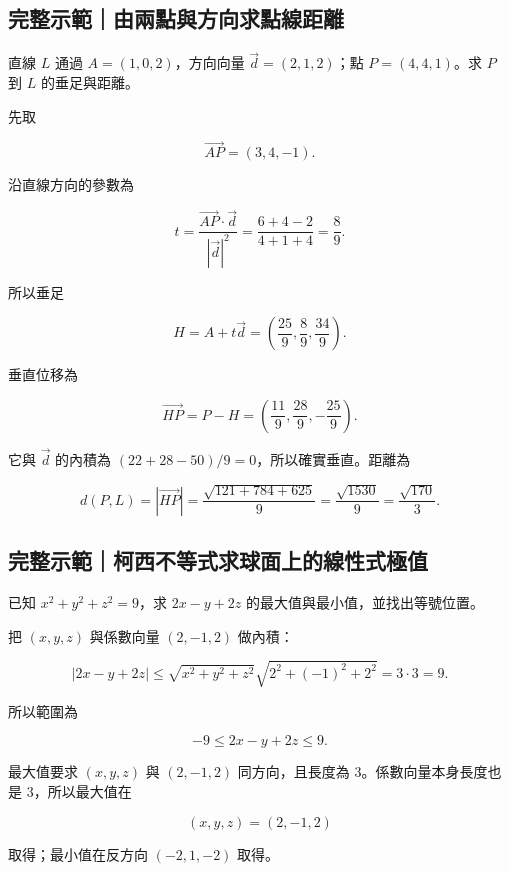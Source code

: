 \documentclass[11pt,a4paper]{article}
\begin{document}
\begin{HandoutWorkedExample}

\subsection{完整示範｜由兩點與方向求點線距離}\label{ux5b8cux6574ux793aux7bc4ux7531ux5169ux9edeux8207ux65b9ux5411ux6c42ux9edeux7ddaux8dddux96e2}

直線 \(L\) 通過 \(A=(1,0,2)\)，方向向量 \(\vec d=(2,1,2)\)；點 \(P=(4,4,1)\)。求 \(P\) 到 \(L\) 的垂足與距離。

先取

\[
\overrightarrow{AP}=(3,4,-1).
\]

沿直線方向的參數為

\[
t=\frac{\overrightarrow{AP}\cdot\vec d}{|\vec d|^2}
=\frac{6+4-2}{4+1+4}
=\frac89.
\]

所以垂足

\[
H=A+t\vec d
=\left(\frac{25}{9},\frac89,\frac{34}{9}\right).
\]

垂直位移為

\[
\overrightarrow{HP}
=P-H
=\left(\frac{11}{9},\frac{28}{9},-\frac{25}{9}\right).
\]

它與 \(\vec d\) 的內積為 \((22+28-50)/9=0\)，所以確實垂直。距離為

\[
d(P,L)=|\overrightarrow{HP}|
=\frac{\sqrt{121+784+625}}9
=\frac{\sqrt{1530}}9
=\frac{\sqrt{170}}3.
\]

\end{HandoutWorkedExample}

\begin{HandoutWorkedExample}

\subsection{完整示範｜柯西不等式求球面上的線性式極值}\label{ux5b8cux6574ux793aux7bc4ux67efux897fux4e0dux7b49ux5f0fux6c42ux7403ux9762ux4e0aux7684ux7ddaux6027ux5f0fux6975ux503c}

已知 \(x^2+y^2+z^2=9\)，求 \(2x-y+2z\) 的最大值與最小值，並找出等號位置。

把 \((x,y,z)\) 與係數向量 \((2,-1,2)\) 做內積：

\[
|2x-y+2z|
\le
\sqrt{x^2+y^2+z^2}\sqrt{2^2+(-1)^2+2^2}
=3\cdot3=9.
\]

所以範圍為

\[
\boxed{-9\le2x-y+2z\le9}.
\]

最大值要求 \((x,y,z)\) 與 \((2,-1,2)\) 同方向，且長度為 \(3\)。係數向量本身長度也是 \(3\)，所以最大值在

\[
(x,y,z)=(2,-1,2)
\]

取得；最小值在反方向 \((-2,1,-2)\) 取得。

\end{HandoutWorkedExample}
\end{document}
